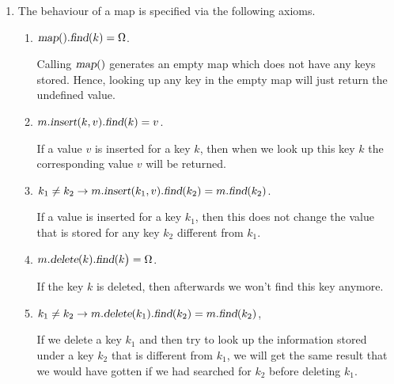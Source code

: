 \begin{Definition}[Map]
{\begin{enumerate}
\begin{enumerate}
              The function call returns the resulting map.
        \item $\textsl{delete}: \textsl{Map} \times \textsl{Key} \rightarrow \textsl{Map}$

              The function call
              \\[0.2cm]
              \hspace*{1.3cm}
              $m.\textsl{delete}(k)$ 
              \\[0.2cm]
              removes the key $k$ and any value associated with $k$ from the map $m$.  If the map $m$ does not contain a value for the
              key $k$, then the map is returned unchanged.

              The function call returns the new map. 
        \end{enumerate}
  \item The behaviour of a map is specified via the following axioms.
        \begin{enumerate}
        \item $\textsl{map}().\textsl{find}(k) = \Omega$.

              Calling $\textsl{map}()$ generates an empty map which does not have any keys stored.
              Hence, looking up any key in the empty map will just return the undefined value.
        \item $m.\textsl{insert}(k, v).\textsl{find}(k) = v$.

              If a value $v$ is inserted for a key $k$, then when we look up this key $k$ the corresponding value
              $v$ will be returned.
        \item $k_1 \not= k_2 \rightarrow m.\textsl{insert}(k_1, v).\textsl{find}(k_2) = m.\textsl{find}(k_2)$.

              If a value is inserted for a key $k_1$, then this does not change the value that is stored
              for any key $k_2$  different from $k_1$.
        \item $m.\textsl{delete}(k).\textsl{find}(k\bigr) = \Omega$.

              If the key $k$ is deleted, then afterwards we won't find this key anymore.
        \item $k_1 \not= k_2 \rightarrow 
               m.\textsl{delete}(k_1).\textsl{find}(k_2) = m.\textsl{find}(k_2)$,

              If  we delete a key $k_1$ and then try to look up the information stored under a key
              $k_2$ that is different from $k_1$, we will get the same result that we would have gotten
              if we had searched for $k_2$ before deleting $k_1$.
              \eox
        \end{enumerate}
  \end{enumerate}
}
\end{Definition}

